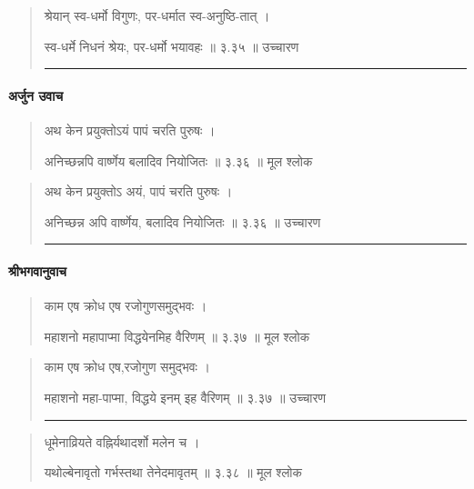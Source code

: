 \begin{quotation}
श्रेयान् स्व-धर्मो विगुणः, पर-धर्मात स्व-अनुष्ठि-तात्‌  ।  

स्व-धर्मे निधनं श्रेयः, पर-धर्मो भयावहः  ॥ ३.३५ ॥  उच्चारण

\noindent\rule{16cm}{0.4pt} 
\end{quotation}

\paragraph{\sanskrit अर्जुन उवाच}

\begin{quotation}



अथ केन प्रयुक्तोऽयं पापं चरति पुरुषः  ।  

अनिच्छन्नपि वार्ष्णेय बलादिव नियोजितः  ॥ ३.३६ ॥  मूल श्लोक
\end{quotation}

\begin{quotation}

अथ केन प्रयुक्तोऽ अयं, पापं चरति पुरुषः  ।  

अनिच्छन्न अपि वार्ष्णेय, बलादिव नियोजितः  ॥ ३.३६ ॥  उच्चारण

\noindent\rule{16cm}{0.4pt} 
\end{quotation}

\paragraph{\sanskrit श्रीभगवानुवाच}

\begin{quotation}



काम एष क्रोध एष रजोगुणसमुद्भवः  ।  

महाशनो महापाप्मा विद्धयेनमिह वैरिणम्‌  ॥ ३.३७ ॥  मूल श्लोक
\end{quotation}

\begin{quotation}

काम एष क्रोध एष,रजोगुण समुद्भवः  ।  

महाशनो महा-पाप्मा, विद्धये इनम् इह वैरिणम्‌  ॥ ३.३७ ॥  उच्चारण

\noindent\rule{16cm}{0.4pt} 
\end{quotation}


\begin{quotation}

धूमेनाव्रियते वह्निर्यथादर्शो मलेन च ।  

यथोल्बेनावृतो गर्भस्तथा तेनेदमावृतम्‌  ॥ ३.३८ ॥  मूल श्लोक
\end{quotation}

